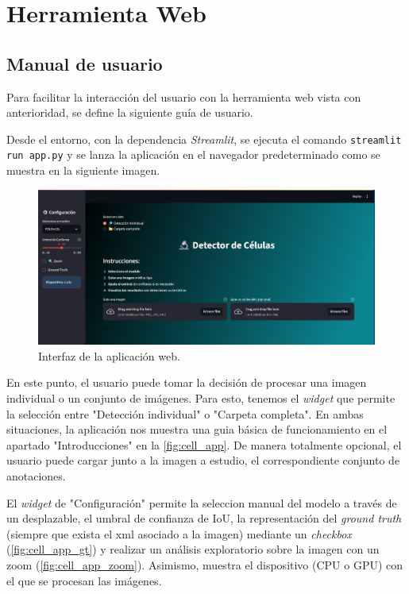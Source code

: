 \documentclass[12pt,a4paper,onecolumn,oneside]{report}
\begin{document}
\chapter{Herramienta Web} %
\label{Herramienta Web anexo}

\section{Manual de usuario}
\label{Manual de usuario}

Para facilitar la interacción del usuario con la herramienta web vista con anterioridad, se define la siguiente guía de usuario.

Desde el entorno, con la dependencia \textit{Streamlit}, se ejecuta el comando \texttt{streamlit run app.py} y se lanza la aplicación en el navegador predeterminado
como se muestra en la siguiente imagen.

\begin{figure}[htbp]
  \centering
  \includegraphics[width=1.0\textwidth]{figuras/app/cell_app.png}
  \caption{Interfaz de la aplicación web.}
  \label{fig:cell_app}
\end{figure}

En este punto, el usuario puede tomar la decisión de procesar una imagen individual o un conjunto de imágenes. Para esto, 
tenemos el \textit{widget} que permite la selección entre "Detección individual" o "Carpeta completa". En ambas situaciones,
la aplicación nos muestra una guia básica de funcionamiento en el apartado "Introducciones" en la \autoref{fig:cell_app}.
De manera totalmente opcional, el usuario puede cargar junto a la imagen a estudio, el correspondiente conjunto de anotaciones.

El \textit{widget} de "Configuración" permite la seleccion manual del modelo a través de un desplazable, el umbral de confianza de IoU, 
la representación del \textit{ground truth} (siempre que exista el xml asociado a la imagen) mediante un \textit{checkbox} (\autoref{fig:cell_app_gt}) y realizar un análisis exploratorio
sobre la imagen con un zoom (\autoref{fig:cell_app_zoom}). Asimismo, muestra el dispositivo (CPU o GPU) con el que se procesan las imágenes.
\end{document}
